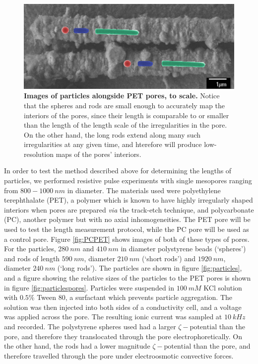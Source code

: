 		\begin{figure}
			\includegraphics[width=\textwidth]{particles_real_size.png}
			\caption{\textbf{Images of particles alongside PET pores, to scale.} Notice that the spheres and rods are small enough to accurately map the interiors of the pores, since their length is comparable to or smaller than the length of the length scale of the irregularities in the pore. On the other hand, the long rods extend along many such irregularities at any given time, and hterefore will produce low-resolution maps of the pores' interiors.}
			\label{fig:particles_real_size}
		\end{figure}



	    
		In order to test the method described above for determining the lengths of particles, we performed resistive pulse experiments with single mesopores ranging from $800-\SI{1000}{nm}$ in diameter. The materials used were polyethylene terephthalate (PET), a polymer which is known to have highly irregularly shaped interiors when pores are prepared \textit{via} the track-etch technique, and polycarbonate (PC), another polymer but with no axial inhomogeneities. The PET pore will be used to test the length measurement protocol, while the PC pore will be used as a control pore. Figure \ref{fig:PCPET} shows images of both of these types of pores. For the particles, $\SI{280}{nm}$ and $\SI{410}{nm}$ in diameter polystyrene beads (`spheres') and rods of length $\SI{590}{nm}$, diameter $\SI{210}{nm}$ (`short rods') and $\SI{1920}{nm}$, diameter $\SI{240}{nm}$ (`long rods'). The particles are shown in figure \ref{fig:particles}, and a figure showing the relative sizes of the particles to the PET pores is shown in figure \ref{fig:particlespores}. Particles were suspended in $\SI{100}{mM}$ KCl solution with $0.5\%$ Tween 80, a surfactant which prevents particle aggregation. The solution was then injected into both sides of a conductivity cell, and a voltage was applied across the pore. The resulting ionic current was sampled at $\SI{10}{kHz}$ and recorded. The polystyrene spheres used had a larger $\zeta-\mathrm{potential}$ than the pore, and therefore they translocated through the pore electrophoretically. On the other hand, the rods had a lower magnitude $\zeta-\mathrm{potential}$ than the pore, and therefore travelled through the pore under electroosmotic convective forces.
		
